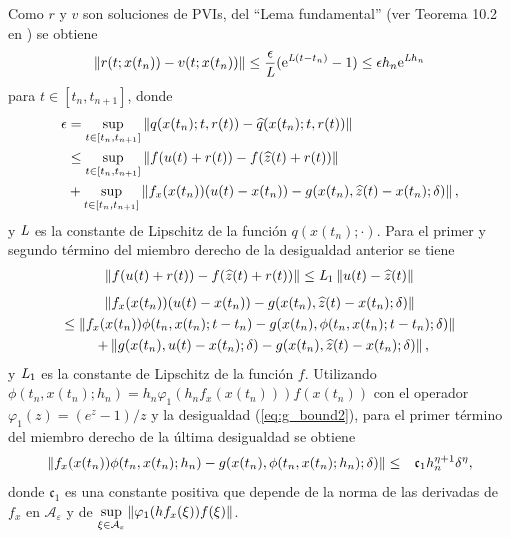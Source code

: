 Como $r$ y $v$ son soluciones de PVIs, del ``Lema fundamental'' (ver Teorema 10.2 en \cite{hairer1993solving}) se obtiene
\begin{equation}
    \left\lVert r(t;x(t_n))-v(t;x(t_n)) \right\rVert \leq \frac{\epsilon}{\emph{L}}(\mathrm{e}^{\emph{L}(t-t_n)}-1)\leq \epsilon h_n \mathrm{e}^{\emph{L}h_n} \label{ineq:bound1}
\end{equation}
para $t\in[t_n,t_{n+1}]$, donde
\begin{align*}
    \epsilon & =  \sup\limits_{t\in[t_n,t_{n+1}]}\left\lVert q(x(t_n);t,r(t))-\widehat{q}(x(t_n);t,r(t)) \right\rVert\\
    &\leq \sup\limits_{t\in[t_n,t_{n+1}]} \left\lVert f(u(t)+r(t))-f(\widehat{z}(t)+r(t)) \right\rVert\\ 
    & + \sup\limits_{t\in[t_n,t_{n+1}]} \left\lVert f_x(x(t_n))(u(t)-x(t_n))-g(x(t_n),\widehat{z}(t)-x(t_n);\delta) \right\rVert,
\end{align*}
y $\emph{L}$ es la constante de Lipschitz de la función $q(x(t_n);\cdotp)$. Para el primer y segundo término del miembro derecho de la desigualdad anterior  se tiene
\begin{align}
    \left\lVert f(u(t)+r(t))-f(\widehat{z}(t)+r(t)) \right\rVert \leq  \emph{L}_1\left\lVert u(t)-\widehat{z}(t) \right\rVert \label{termino1}
\end{align}
\begin{multline}
    \left\lVert f_x(x(t_n))(u(t)-x(t_n))-g(x(t_n),\widehat{z}(t)-x(t_n);\delta) \right\rVert \\
    \leq \left\lVert f_x(x(t_n))\phi(t_n,x(t_n);t-t_n)-g(x(t_n),\phi(t_n,x(t_n);t-t_n);\delta)  \right\rVert \\
    \enspace+ \left\lVert g(x(t_n),u(t)-x(t_n);\delta)-g(x(t_n),\widehat{z}(t)-x(t_n);\delta) \right\rVert,
    \label{termino2}
\end{multline}
y $\emph{L}_1$ es la constante de Lipschitz de la función $f$. Utilizando  $\phi(t_n,x(t_n);h_n)=h_n\varphi_1(h_n f_x(x(t_n)))f(x(t_n))$ con el operador $\varphi_1(z)=(e^z-1)/z$ y la desigualdad (\ref{eq:g_bound2}), para el primer término del miembro derecho de la última desigualdad se obtiene
\begin{eqnarray}
    \left\lVert  f_x(x(t_n))\phi(t_n,x(t_n);h_n) -g(x(t_n),\phi(t_n,x(t_n);h_n);\delta)  \right\rVert &  \leq & \mathfrak{c}_1 h_n^{\eta+1}\delta^{\eta}, \label{termino3}
\end{eqnarray}
donde  $\mathfrak{c}_1$ es una constante positiva que depende de la norma de las derivadas de $f_x$ en  $\mathcal{A}_\varepsilon$ y de $\sup\limits_{\xi\in \mathcal{A}_\varepsilon} \left\lVert \varphi_1(h f_x(\xi))f(\xi) \right\rVert$.

